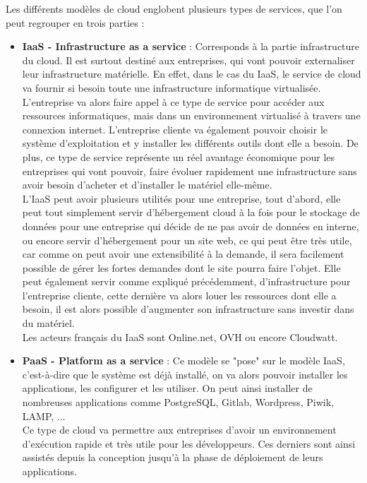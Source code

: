 \documentclass[]{article}
\begin{document}
\vspace{0,5cm}
Les différents modèles de cloud englobent plusieurs types de services,
que l'on peut regrouper en trois parties :
\begin{itemize}
\item  \textbf{IaaS - Infrastructure as a service} : Corresponds à la partie infrastructure du cloud. Il est surtout destiné aux entreprises, qui vont pouvoir externaliser leur infrastructure matérielle. En effet, dans le cas du IaaS, le service de cloud va fournir si besoin toute une infrastructure informatique virtualisée.\\
L'entreprise va alors faire appel à ce type de service pour accéder aux ressources informatiques, mais dans un environnement virtualisé à travers une connexion internet. L'entreprise cliente va également pouvoir choisir le système d'exploitation et y installer les différents outils dont elle a besoin. De plus, ce type de service représente un réel avantage économique pour les entreprises qui vont pouvoir, faire évoluer rapidement une infrastructure sans avoir besoin d'acheter et d'installer le matériel elle-même.\\
L'IaaS peut avoir plusieurs utilités pour une entreprise, tout d'abord, elle peut tout simplement servir d'hébergement cloud à la fois pour le stockage de données pour une entreprise qui décide de ne pas avoir de données en interne, ou encore servir d'hébergement pour un site web, ce qui peut être très utile, car comme on peut avoir une extensibilité à la demande, il sera facilement possible de gérer les fortes demandes dont le site pourra faire l'objet. Elle peut également servir comme expliqué précédemment, d'infrastructure pour l'entreprise cliente, cette dernière va alors louer les ressources dont elle a besoin, il est alors possible d'augmenter son infrastructure sans investir dans du matériel.\\
Les acteurs français du IaaS sont Online.net, OVH ou encore Cloudwatt.
\item \textbf{PaaS - Platform as a service }: Ce modèle se "pose" sur le modèle IaaS, c'est-à-dire que le système est déjà installé, on va alors pouvoir installer les applications, les configurer et les utiliser. On peut ainsi installer de nombreuses applications comme PostgreSQL, Gitlab, Wordpress, Piwik, LAMP, ...\\
Ce type de cloud va permettre aux entreprises d'avoir un environnement d'exécution rapide et très utile pour les développeurs. Ces derniers sont ainsi assistés depuis la conception jusqu'à la phase de déploiement de leurs applications.\\

\end{itemize}
\end{document}
